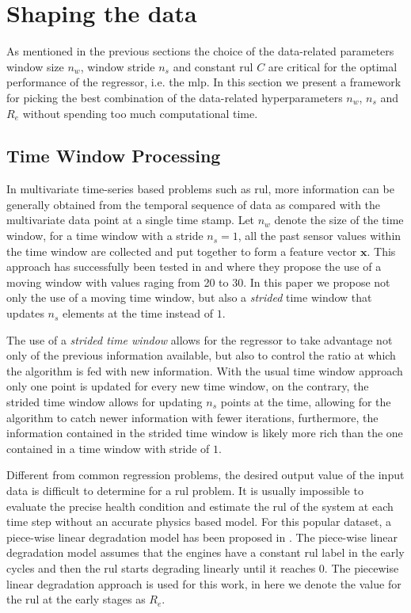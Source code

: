 \section{Shaping the data}

As mentioned in the previous sections the choice of the data-related parameters window size $n_w$, window stride $n_s$ and constant \gls{rul} $C$ are critical for the optimal performance of the regressor, i.e. the \gls{mlp}. In this section we present a framework for picking the best combination of the data-related hyperparameters $n_w$, $n_s$ and $R_e$ without spending too much computational time.

\subsection{Time Window Processing}

In multivariate time-series based problems such as \gls{rul}, more information can be generally obtained from the temporal sequence of data as compared with the multivariate data point at a single time stamp. Let $n_w$ denote the size of the time window, for a time window with a stride $n_s = 1$, all the past sensor values within the time window are collected and put together to form a feature vector $\mathbf{x}$. This approach has successfully been tested in \cite{Li2018} and \cite{Lim2016} where they propose the use of a moving window with values raging from 20 to 30. In this paper we propose not only the use of a moving time window, but also a \textit{strided} time window that updates $n_s$ elements at the time instead of $1$. 

The use of a \textit{strided time window} allows for the regressor to take advantage not only of the previous information available, but also to control the ratio at which the algorithm is fed with new information. With the usual time window approach only one point is updated for every new time window, on the contrary, the strided time window allows for updating $n_s$ points at the time, allowing for the algorithm to catch newer information with fewer iterations, furthermore, the information contained in the strided time window is likely more rich than the one contained in a time window with stride of $1$.

Different from common regression problems, the desired output value of the input data is difficult to determine for a \gls{rul} problem. It is usually impossible to evaluate the precise health condition and estimate the \gls{rul} of the system at each time step without an accurate physics based model. For this popular dataset, a piece-wise linear degradation model has been proposed in . The piece-wise linear degradation model assumes that the engines have a constant \gls{rul} label in the early cycles and then the \gls{rul} starts degrading linearly until it reaches 0. The piecewise linear degradation approach is used for this work, in here we denote the value for the \gls{rul} at the early stages as $R_e$. 


